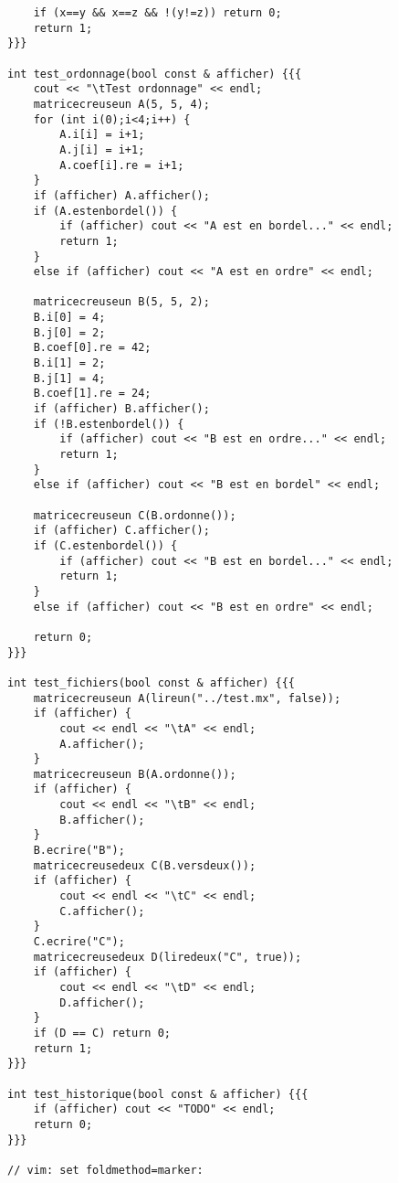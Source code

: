 \documentclass[a4paper]{article}
\begin{document}
\begin{verbatim}
    if (x==y && x==z && !(y!=z)) return 0;
    return 1;
}}}

int test_ordonnage(bool const & afficher) {{{
    cout << "\tTest ordonnage" << endl;
    matricecreuseun A(5, 5, 4);
    for (int i(0);i<4;i++) {
        A.i[i] = i+1;
        A.j[i] = i+1;
        A.coef[i].re = i+1;
    }
    if (afficher) A.afficher();
    if (A.estenbordel()) {
        if (afficher) cout << "A est en bordel..." << endl;
        return 1;
    }
    else if (afficher) cout << "A est en ordre" << endl;

    matricecreuseun B(5, 5, 2);
    B.i[0] = 4;
    B.j[0] = 2;
    B.coef[0].re = 42;
    B.i[1] = 2;
    B.j[1] = 4;
    B.coef[1].re = 24;
    if (afficher) B.afficher();
    if (!B.estenbordel()) {
        if (afficher) cout << "B est en ordre..." << endl;
        return 1;
    }
    else if (afficher) cout << "B est en bordel" << endl;

    matricecreuseun C(B.ordonne());
    if (afficher) C.afficher();
    if (C.estenbordel()) {
        if (afficher) cout << "B est en bordel..." << endl;
        return 1;
    }
    else if (afficher) cout << "B est en ordre" << endl;

    return 0;
}}}

int test_fichiers(bool const & afficher) {{{
    matricecreuseun A(lireun("../test.mx", false));
    if (afficher) {
        cout << endl << "\tA" << endl;
        A.afficher();
    }
    matricecreuseun B(A.ordonne());
    if (afficher) {
        cout << endl << "\tB" << endl;
        B.afficher();
    }
    B.ecrire("B");
    matricecreusedeux C(B.versdeux());
    if (afficher) {
        cout << endl << "\tC" << endl;
        C.afficher();
    }
    C.ecrire("C");
    matricecreusedeux D(liredeux("C", true));
    if (afficher) {
        cout << endl << "\tD" << endl;
        D.afficher();
    }
    if (D == C) return 0;
    return 1;
}}}

int test_historique(bool const & afficher) {{{
    if (afficher) cout << "TODO" << endl;
    return 0;
}}}

// vim: set foldmethod=marker:
\end{verbatim}
\end{document}
